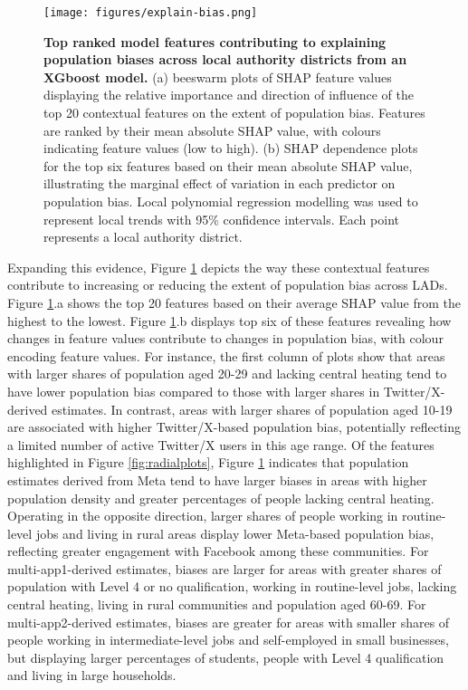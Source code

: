\documentclass[]{rsos}%
\begin{document}
\begin{figure}
\centering
\texttt{[image: figures/explain-bias.png]}
\caption{\textbf{Top ranked model features contributing to explaining population biases across local authority districts from an XGboost model.} (a) beeswarm plots of SHAP feature values displaying the relative importance and direction of influence of the top 20 contextual features on the extent of population bias. Features are ranked by their mean absolute SHAP value, with colours indicating feature values (low to high). (b) SHAP dependence plots for the top six features based on their mean absolute SHAP value, illustrating the marginal effect of variation in each predictor on population bias. Local polynomial regression modelling was used to represent local trends with 95\% confidence intervals. Each point represents a local authority district.}\label{fig:shap-plots}
\end{figure}

Expanding this evidence, Figure \ref{fig:shap-plots} depicts the way these contextual features contribute to increasing or reducing the extent of population bias across LADs. Figure \ref{fig:shap-plots}.a shows the top 20 features based on their average SHAP value from the highest to the lowest. Figure \ref{fig:shap-plots}.b displays top six of these features revealing how changes in feature values contribute to changes in population bias, with colour encoding feature values. For instance, the first column of plots show that areas with larger shares of population aged 20-29 and lacking central heating tend to have lower population bias compared to those with larger shares in Twitter/X-derived estimates. In contrast, areas with larger shares of population aged 10-19 are associated with higher Twitter/X-based population bias, potentially reflecting a limited number of active Twitter/X users in this age range. Of the features highlighted in Figure \ref{fig:radialplots}, Figure \ref{fig:shap-plots} indicates that population estimates derived from Meta tend to have larger biases in areas with higher population density and greater percentages of people lacking central heating. Operating in the opposite direction, larger shares of people working in routine-level jobs and living in rural areas display lower Meta-based population bias, reflecting greater engagement with Facebook among these communities. For multi-app1-derived estimates, biases are larger for areas with greater shares of population with Level 4 or no qualification, working in routine-level jobs, lacking central heating, living in rural communities and population aged 60-69. For multi-app2-derived estimates, biases are greater for areas with smaller shares of people working in intermediate-level jobs and self-employed in small businesses, but displaying larger percentages of students, people with Level 4 qualification and living in large households.
\end{document}
